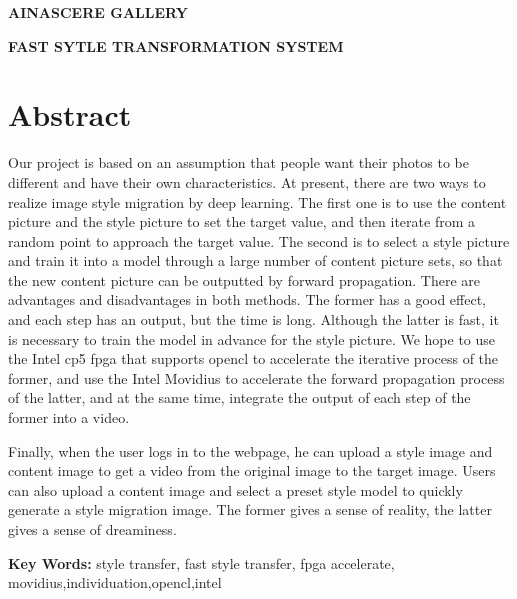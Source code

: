 \centerline{\bfseries{} AINASCERE GALLERY}
\centerline{\bfseries{} FAST SYTLE TRANSFORMATION SYSTEM}
\section*{ \centering \textbf{Abstract} }

Our project is based on an assumption that people want their photos to be different and have their own characteristics.
At present, there are two ways to realize image style migration by deep learning. The first one is to use the content picture and the style picture to set the target value, and then iterate from a random point to approach the target value. The second is to select a style picture and train it into a model through a large number of content picture sets, so that the new content picture can be outputted by forward propagation.
There are advantages and disadvantages in both methods. The former has a good effect, and each step has an output, but the time is long. Although the latter is fast, it is necessary to train the model in advance for the style picture.
We hope to use the Intel cp5 fpga that supports opencl to accelerate the iterative process of the former, and use the Intel Movidius to accelerate the forward propagation process of the latter, and at the same time, integrate the output of each step of the former into a video.

Finally, when the user logs in to the webpage, he can upload a style image and content image to get a video from the original image to the target image. Users can also upload a content image and select a preset style model to quickly generate a style migration image. The former gives a sense of reality, the latter gives a sense of dreaminess.

\textbf{Key Words:} style transfer, fast style transfer, fpga accelerate, movidius,individuation,opencl,intel





